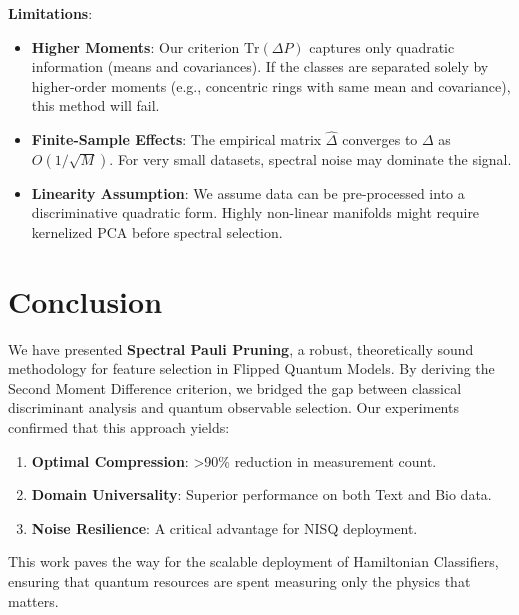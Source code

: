 \documentclass[conference]{IEEEtran}
\begin{document}
\textbf{Limitations}: 
\begin{itemize}
    \item \textbf{Higher Moments}: Our criterion $\text{Tr}(\Delta P)$ captures only quadratic information (means and covariances). If the classes are separated solely by higher-order moments (e.g., concentric rings with same mean and covariance), this method will fail.
    \item \textbf{Finite-Sample Effects}: The empirical matrix $\hat{\Delta}$ converges to $\Delta$ as $O(1/\sqrt{M})$. For very small datasets, spectral noise may dominate the signal.
    \item \textbf{Linearity Assumption}: We assume data can be pre-processed into a discriminative quadratic form. Highly non-linear manifolds might require kernelized PCA before spectral selection.
\end{itemize}

\section{Conclusion}
We have presented \textbf{Spectral Pauli Pruning}, a robust, theoretically sound methodology for feature selection in Flipped Quantum Models. By deriving the Second Moment Difference criterion, we bridged the gap between classical discriminant analysis and quantum observable selection. Our experiments confirmed that this approach yields:
\begin{enumerate}
    \item \textbf{Optimal Compression}: >90\% reduction in measurement count.
    \item \textbf{Domain Universality}: Superior performance on both Text and Bio data.
    \item \textbf{Noise Resilience}: A critical advantage for NISQ deployment.
\end{enumerate}
This work paves the way for the scalable deployment of Hamiltonian Classifiers, ensuring that quantum resources are spent measuring only the physics that matters.



\end{document}
